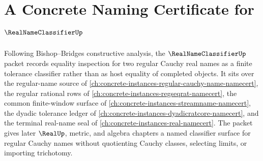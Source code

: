\chapter{A Concrete Naming Certificate for $\RealNameClassifierUp$}
\label{ch:concrete-instances-realnameclassifier-namecert}

Following Bishop--Bridges constructive analysis, the $\RealNameClassifierUp$ packet records equality inspection for two regular Cauchy real names as a finite tolerance classifier rather than as host equality of completed objects. It sits over the regular-name source of \autoref{ch:concrete-instances-regular-cauchy-name-namecert}, the regular rational rows of \autoref{ch:concrete-instances-regseqrat-namecert}, the common finite-window surface of \autoref{ch:concrete-instances-streamname-namecert}, the dyadic tolerance ledger of \autoref{ch:concrete-instances-dyadicratcore-namecert}, and the terminal real-name seal of \autoref{ch:concrete-instances-real-namecert}. The packet gives later $\RealUp$, metric, and algebra chapters a named classifier surface for regular Cauchy names without quotienting Cauchy classes, selecting limits, or importing trichotomy.

